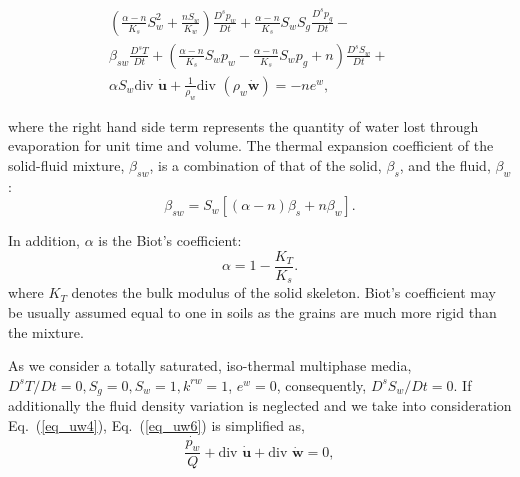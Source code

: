 \documentclass[twocolumn]{svjour3}          %
\begin{document}
\begin{eqnarray}\label{eq_uw6}
\left( \frac{\alpha-n}{K_s}S_w^2+\frac{nS_w}{K_w}\right)\frac{D^s p_w}{D t} + \frac{\alpha-n}{K_s}S_wS_g\frac{D^s p_g}{D t} -&&  \nonumber \\ 
 \beta_{sw}\frac{D^s T}{D t} +  \left(\frac{\alpha-n}{K_s}S_w p_w-\frac{\alpha-n}{K_s}S_w p_g+n\right)\frac{D^s S_w}{D t}  +&&  \nonumber \\ 
\alpha S_w  \mbox{div } \dot{\boldsymbol{u}}  + \frac{1}{\rho_w} \mbox{div } (\rho_w \dot{\boldsymbol{w}}) = - n e^w, &&  %
\end{eqnarray}

where the right hand side term represents the quantity of water lost through evaporation for unit time and volume. The  thermal expansion coefficient of the solid-fluid mixture, $\beta_{sw}$, is a combination of that of the solid, $\beta_s$, and  the fluid, $\beta_w$:
\begin{equation}
\beta_{sw} = S_w [(\alpha-n)\beta_s +n \beta_w].
\end{equation}

In addition, $\alpha$ is the Biot's coefficient:
\begin{equation}\label{eq_uw7}
\alpha=1-\frac{K_T}{K_s}.
\end{equation}
where $K_T$ denotes the %
 bulk modulus of the solid skeleton.  Biot's coefficient may be usually assumed equal to one in soils as the grains are much more rigid than the mixture. 
   
As we consider a totally saturated, iso-thermal multiphase media,  $D^s T/D t =0, S_g=0, S_w=1, k^{rw}=1$, $e^w=0$, consequently, %
$D^s S_w/D t =0$. If  additionally  the fluid density variation is neglected and we take into consideration Eq.~(\ref{eq_uw4}),  Eq.~(\ref{eq_uw6}) is simplified as,
\begin{equation}
\frac{\dot{p_w}}{Q} +  \mbox{div }  \boldsymbol{\dot{u}} + \mbox{div } \boldsymbol{\dot{w}} = 0 \label{eq_uw10},
\end{equation}

\end{document}
